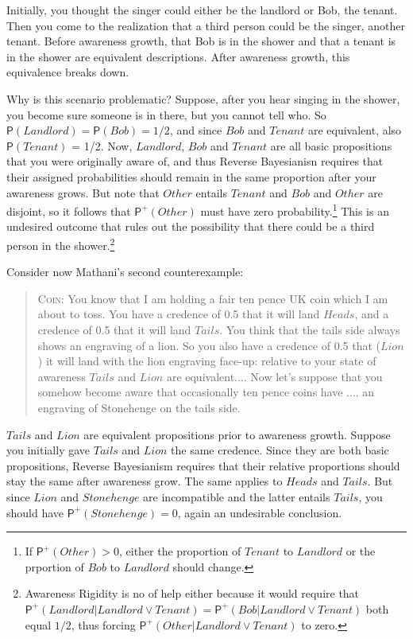 \documentclass[
  11pt,
  dvipsnames,enabledeprecatedfontcommands]{scrartcl}
\newcommand{\pr}[1]{\ensuremath{\mathsf{P}(#1)}}
\newcommand{\ppr}[2]{\ensuremath{\mathsf{P}^{#1}(#2)}}
\begin{document}
\noindent Initially, you thought the singer could either be the landlord
or Bob, the tenant. Then you come to the realization that a third person
could be the singer, another tenant. Before awareness growth, that Bob
is in the shower and that a tenant is in the shower are equivalent
descriptions. After awareness growth, this equivalence breaks down.

Why is this scenario problematic? Suppose, after you hear singing in the
shower, you become sure someone is in there, but you cannot tell who. So
\(\pr{Landlord} = \pr{Bob} = 1/2\), and since \(Bob\) and \(Tenant\) are
equivalent, also \(\pr{Tenant}\) = 1/2. Now, \(Landlord\), \(Bob\) and
\(Tenant\) are all basic propositions that you were originally aware of,
and thus Reverse Bayesianisn requires that their assigned probabilities
should remain in the same proportion after your awareness grows. But
note that \(Other\) entails \(Tenant\) and \(Bob\) and \(Other\) are
disjoint, so it follows that \(\ppr{+}{Other}\) must have zero
probability.\footnote{If \(\ppr{+}{Other}>0\), either the proportion of
  \(Tenant\) to \(Landlord\) or the prportion of \(Bob\) to \(Landlord\)
  should change.} This is an undesired outcome that rules out the
possibility that there could be a third person in the shower.\footnote{Awareness
  Rigidity is no of help either because it would require that
  \(\ppr{+}{Landlord \vert Landlord \vee Tenant}=\ppr{+}{Bob \vert Landlord \vee Tenant}\)
  both equal \(1/2\), thus forcing
  \(\ppr{+}{Other \vert Landlord \vee Tenant}\) to zero.}

Consider now Mathani's second counterexample:

\begin{quote} 
\textsc{Coin}: You know that I am holding a fair ten pence UK coin which I am about to toss. You
have a credence of 0.5 that it will land $Heads$, and a credence of 0.5 that it will
land $Tails$. You think that the tails side always shows an engraving of a lion. So you
also  have a credence of 0.5 that ($Lion$) it will land with the lion engraving face-up: relative to your state of awareness $Tails$ and $Lion$ are equivalent.... Now let's suppose that you somehow become aware
that occasionally ten pence coins have .... an engraving of Stonehenge on the tails side. 
\end{quote}

\noindent  \(Tails\) and \(Lion\) are equivalent propositions prior to
awareness growth. Suppose you initially gave \(Tails\) and \(Lion\) the
same credence. Since they are both basic propositions, Reverse
Bayesianism requires that their relative proportions should stay the
same after awareness grow. The same applies to \(Heads\) and \(Tails\).
But since \(Lion\) and \(Stonehenge\) are incompatible and the latter
entails \(Tails\), you should have \(\ppr{+}{Stonehenge} = 0\), again an
undesirable conclusion.
\end{document}
